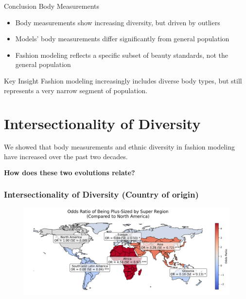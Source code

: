\documentclass[aspectratio=169,xcolor=dvipsnames,10pt]{beamer}
\begin{document}
\begin{frame}{Conclusion Body Measurements}
    \begin{itemize}
        \setlength{\itemsep}{0.8em}
        \pause \item Body measurements show increasing diversity, but driven by outliers
        \pause \item Models' body measurements differ significantly from general population
        \pause \item Fashion modeling reflects a specific subset of beauty standards, not the general population
    \end{itemize}
    \pause
    \vspace{1em}
    \begin{block}{Key Insight}
        Fashion modeling increasingly includes diverse body types, but still represents a very narrow segment of population.
    \end{block}
    
\end{frame}
\section{Intersectionality of Diversity}


\begin{frame}
    \Large{
        \begin{center}
            We showed that body measurements and ethnic diversity in fashion modeling have increased over the past two decades.\\
                        \vspace{1em}

            \textbf{How does these two evolutions relate?}\\
        \end{center}
    }
\end{frame}


\begin{frame}[t]
    \frametitle{Intersectionality of Diversity (Country of origin)}
    \begin{figure}
            \begin{center}
            \includegraphics[width=\textwidth]{figures/super_region_odds_map.png}
            \end{center}
        \end{figure}
\end{frame}
\end{document}
